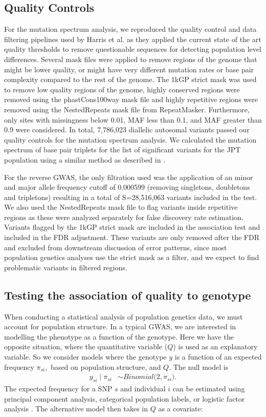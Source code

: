 \documentclass[9pt,lineno]{template}
\begin{document}
\subsection{Quality Controls}
For the mutation spectrum analysis, we reproduced the quality control and data filtering pipelines used by Harris et al. as they applied the current state of the art quality thresholds to remove questionable sequences for detecting population level differences. 
Several mask files were applied to remove regions of the genome that might be lower quality, or might have very different mutation rates or base pair complexity compared to the rest of the genome. 
The 1kGP strict mask was used to remove low quality regions of the genome, highly conserved regions were removed using the phastCons100way mask file and highly repetitive regions were removed using the NestedRepeats mask file from RepeatMasker.
Furthermore, only sites with missingness below 0.01, MAF less than 0.1, and MAF greater than 0.9 were considered.
In total, 7,786,023 diallelic autosomal variants passed our quality controls for the mutation spectrum analysis.
We calculated the mutation spectrum of base pair triplets for the list of significant variants for the JPT population using a similar method as described in  \citep{Harris2017a}.

For the reverse GWAS, the only filtration used was the application of an minor and major allele frequency cutoff of 0.000599 (removing singletons, doubletons and tripletons) resulting in a total of S=28,516,063 variants included in the test. 
We also used the NestedRepeats mask file to flag variants inside repetitive regions as these were analyzed separately for false discovery rate estimation.
Variants flagged by the 1kGP strict mask are included in the association test and included in the FDR adjustment. 
These variants are only removed after the FDR and excluded from downstream discussion of error patterns, since most population genetics analyses use the strict mask as a filter, and we expect to find problematic variants in filtered regions.

\subsection{Testing the association of quality to genotype}
When conducting a statistical analysis of population genetics data, we must account for population structure. In a typical GWAS, we are interested in modelling the phenotype as a function of the genotype. 
Here we have the opposite situation, where the quantitative variable ($Q$) is used as an explanatory variable. 
So we consider models where the genotype $y$ is a function of an expected frequency $\pi_{si},$ based on population structure, and $Q$. 
The null model is 
\begin{align} \label{lfa_basic}
y_{si} \mid \pi_{si}  &\sim Binomial\big( 2, \pi_{si} \big).
\end{align} 
The expected frequency for a SNP $s$ and individual $i$ can be estimated using principal component analysis, categorical population labels, or logistic factor analysis \citep{song2015testing}. The alternative model then takes in $Q$ as a covariate: 
\end{document}
